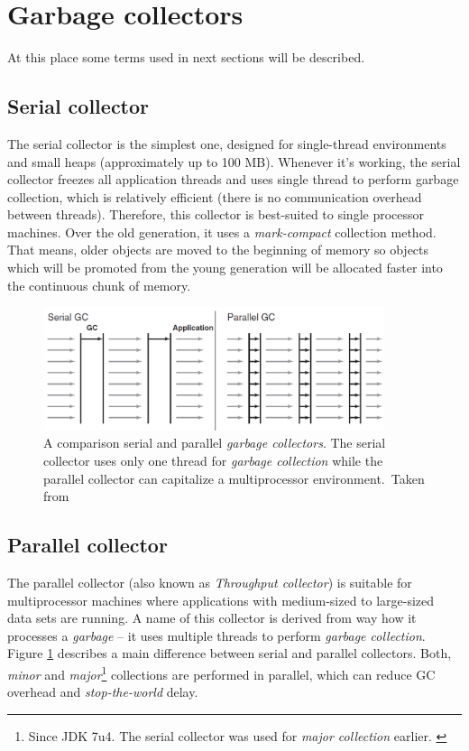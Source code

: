 \documentclass[
  digital, %
  oneside,
  notable, %
  nolof,     %
  nolot     %
]{fithesis3}
\begin{document}
\section{Garbage collectors}
At this place some terms used in next sections will be described.


\subsection{Serial collector}
The serial collector is the simplest one, designed for single-thread environments and small heaps (approximately up to 100 MB). Whenever it's working, the serial collector freezes all application threads and uses single thread to perform garbage collection, which is relatively efficient (there is no communication overhead between threads). Therefore, this collector is best-suited to single processor machines. Over the old generation, it uses a \textit{mark-compact} collection method. That means, older objects are moved to the beginning of memory so objects which will be promoted from the young generation will be allocated faster into the continuous chunk of memory.~\cite{gctuning}~\cite{hunt}

\begin{figure}[h]
	\centering
	\includegraphics[width=10cm]{fig/serialparallel.png}
	\caption{A comparison serial and parallel \textit{garbage collectors}. The serial collector uses only one thread for \textit{garbage collection} while the parallel collector can capitalize a multiprocessor environment.~Taken from \cite{hunt}}
	\label{serialparallel}
\end{figure}

\subsection{Parallel collector}
The parallel collector (also known as \textit{Throughput collector}) is suitable for multiprocessor machines where applications with medium-sized to large-sized data sets are running. A name of this collector is derived from way how it processes a \textit{garbage} -- it uses multiple threads to perform \textit{garbage collection}. Figure \ref{serialparallel} describes a main difference between serial and parallel collectors. Both, \textit{minor} and \textit{major}\footnote{Since JDK 7u4. The serial collector was used for \textit{major collection} earlier. \cite{scott}} collections are performed in parallel, which can reduce GC overhead and \textit{stop-the-world} delay. \cite{gctuning} \cite{scott} \cite{hunt}
\end{document}
